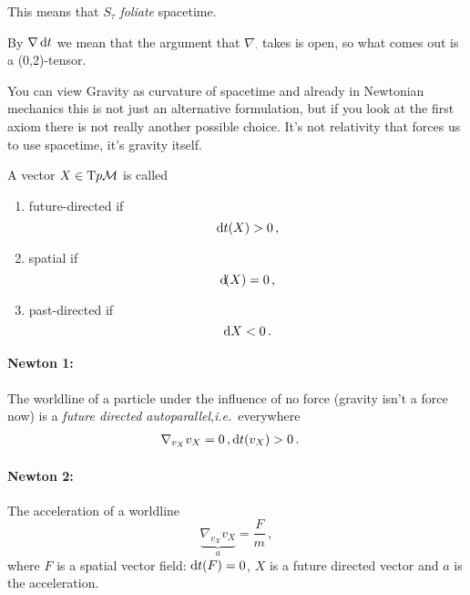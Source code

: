 This means that $S_\tau$ \textit{foliate} spacetime.
\begin{note}
    By $\nabla \operatorname{d\!} t$ we mean that the argument that $\nabla_\cdot$ takes is
    open, so what comes out is a (0,2)-tensor.
\end{note}
\begin{note}
    You can view Gravity as curvature of spacetime and already in Newtonian mechanics
    this is not just an alternative formulation,
    but if you look at the first axiom there is not really another possible choice.
    It's not relativity that forces us to use spacetime, it's gravity itself.
\end{note}
\begin{defn}[]
    A vector $X\in\T{p}\M$ is called
    \begin{enumerate}
        \item future-directed if
            \begin{equation}
                \operatorname{d\!} t(X) > 0\,,
            \end{equation}
        \item spatial if
            \begin{equation}
                \operatorname{d\!}(X) = 0\,,
            \end{equation}

        \item past-directed if
            \begin{equation}
                \operatorname{d\!}{X}<0\,.
            \end{equation}
    \end{enumerate}
\end{defn}
\paragraph{Newton 1:} The worldline of a particle under the influence
of no force (gravity isn't a force now) is a \textit{future directed
autoparallel},\textit{i.e.}\ everywhere
\begin{align}
    \nabla_{v_X}v_X &= 0\,,
    \operatorname{d\!} t(v_X)>0\,.
\end{align}
\paragraph{Newton 2:}
The acceleration of a worldline
\begin{equation}
    \underbrace{\nabla_{v_X}v_X}_a = \frac{F}{m}\,,
\end{equation}
where $F$ is a spatial vector field: $\operatorname{d\!} t(F) =0$, $X$ is a future directed vector
and $a$ is the acceleration.
